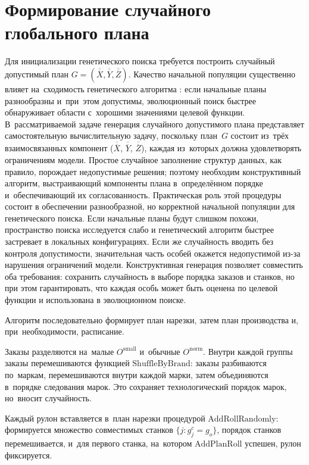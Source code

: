 \section{Формирование случайного глобального плана}\label{sec:alg/random_plan}

Для инициализации генетического поиска требуется построить случайный допустимый план $G=(\overline{\overline{X}},\overline{\overline{Y}},\overline{\overline{Z}})$.
Качество начальной популяции существенно влияет на~сходимость генетического алгоритма \cite{goldberg1989genetic,gladkov2010, eiben2015_intro_ec}: если начальные планы разнообразны и~при~этом допустимы, эволюционный поиск быстрее обнаруживает области с~хорошими значениями целевой функции.
В~рассматриваемой задаче генерация случайного допустимого плана представляет самостоятельную вычислительную задачу, поскольку план~$G$ состоит из~трёх взаимосвязанных компонент ($\overline{\overline{X}}$, $\overline{\overline{Y}}$, $\overline{\overline{Z}}$), каждая из~которых должна удовлетворять ограничениям модели.
Простое случайное заполнение структур данных, как правило, порождает недопустимые решения; поэтому необходим конструктивный алгоритм, выстраивающий компоненты плана в~определённом порядке и~обеспечивающий их согласованность.
Практическая роль этой процедуры состоит в обеспечении разнообразной, но корректной начальной популяции для генетического поиска. Если начальные планы будут слишком похожи, пространство поиска исследуется слабо и генетический алгоритм быстрее застревает в локальных конфигурациях. Если же случайность вводить без контроля допустимости, значительная часть особей окажется недопустимой из-за нарушения ограничений модели. Конструктивная генерация позволяет совместить оба требования: сохранить случайность в выборе порядка заказов и станков, но при этом гарантировать, что каждая особь может быть оценена по целевой функции и использована в эволюционном поиске.

Алгоритм последовательно формирует план нарезки, затем план производства и, при~необходимости, расписание.

Заказы разделяются на~малые $O^{\mathrm{small}}$ и~обычные $O^{\mathrm{norm}}$.
Внутри каждой группы заказы перемешиваются функцией $\mathrm{ShuffleByBrand}$: заказы разбиваются по~маркам, перемешиваются внутри каждой марки, затем объединяются в~порядке следования марок.
Это сохраняет технологический порядок марок, но~вносит случайность.

Каждый рулон вставляется в~план нарезки процедурой $\mathrm{AddRollRandomly}$: формируется множество совместимых станков $\{j:g^c_j=g_o\}$, порядок станков перемешивается, и~для первого станка, на~котором $\mathrm{AddPlanRoll}$ успешен, рулон фиксируется.


